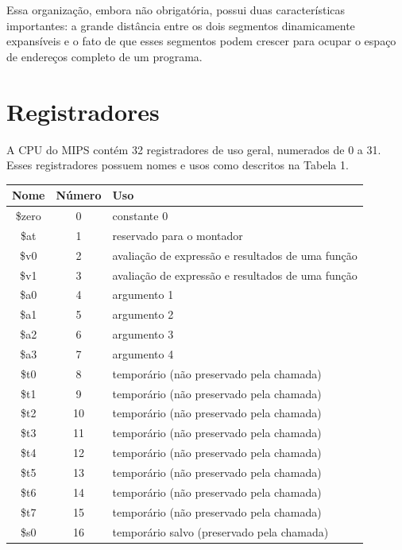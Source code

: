 \documentclass[
	12pt,				%
	oneside,			%
	a4paper,			%
	english,			%
	brazil				%
	]{abntex2ppgsi}
\begin{document}
Essa organização, embora não obrigatória, possui duas características importantes: a grande distância entre os dois segmentos dinamicamente expansíveis e o fato de que esses segmentos podem crescer para ocupar o espaço de endereços completo de um programa.

\section{Registradores}
A CPU do MIPS contém 32 registradores de uso geral, numerados de 0 a 31. Esses registradores possuem nomes e usos como descritos na Tabela 1.

\begin{table}[h]
    \centering
    \begin{tabular}{c|c|l}
        Nome & Número & Uso \\ \hline
        \$zero & 0 & constante 0\\ \hline
        \$at & 1 & reservado para o montador\\ \hline
        \$v0 & 2 & avaliação de expressão e resultados de uma função\\ \hline
        \$v1 & 3 & avaliação de expressão e resultados de uma função\\ \hline
        \$a0 & 4 & argumento 1\\ \hline
        \$a1 & 5 & argumento 2\\ \hline
        \$a2 & 6 & argumento 3\\ \hline
        \$a3 & 7 & argumento 4\\ \hline
        \$t0 & 8 & temporário (não preservado pela chamada)\\ \hline
        \$t1 & 9 & temporário (não preservado pela chamada)\\ \hline
        \$t2 & 10 & temporário (não preservado pela chamada)\\ \hline
        \$t3 & 11 & temporário (não preservado pela chamada)\\ \hline
        \$t4 & 12 & temporário (não preservado pela chamada)\\ \hline
        \$t5 & 13 & temporário (não preservado pela chamada)\\ \hline
        \$t6 & 14 & temporário (não preservado pela chamada)\\ \hline
        \$t7 & 15 & temporário (não preservado pela chamada)\\ \hline
        \$s0 & 16 & temporário salvo (preservado pela chamada)\\ \hline

\end{tabular}
\end{table}
\end{document}
